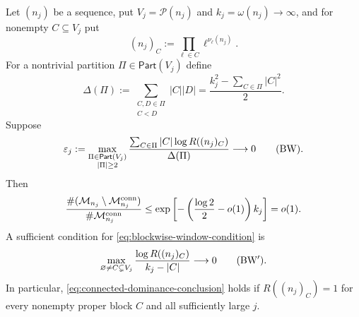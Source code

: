 \begin{theorem}
\label{thm:blockwise-connected-dominance}
Let $(n_j)$ be a sequence, put $V_j=\mathcal P(n_j)$ and
$k_j=\omega(n_j)\to\infty$, and for nonempty $C\subseteq V_j$ put
\[
 (n_j)_C:=\prod_{\ell\in C}\ell^{\nu_\ell(n_j)}.
\]
For a nontrivial partition $\Pi\in\mathsf{Part}(V_j)$ define
\[
 \Delta(\Pi):=\sum_{\substack{C,D\in\Pi\\C<D}}|C||D|
 =\frac{k_j^2-\sum_{C\in\Pi}|C|^2}{2}.
\]
Suppose
\begin{equation}\label{eq:blockwise-window-condition}
 \varepsilon_j:=
 \max_{\substack{\Pi\in\mathsf{Part}(V_j)\\|\Pi|\ge2}}
 \frac{\sum_{C\in\Pi}|C|\log R((n_j)_C)}{\Delta(\Pi)}
 \longrightarrow0\qquad\text{\rm(BW)}.
\end{equation}
Then
\begin{equation}\label{eq:connected-dominance-conclusion}
 \frac{\#(\mathcal M_{n_j}\setminus\mathcal M_{n_j}^{\rm conn})}
 {\#\mathcal M_{n_j}^{\rm conn}}
 \le\exp\left[-\left(\frac{\log2}{2}-o(1)\right)k_j\right]
 =o(1).
\end{equation}
A sufficient condition for \eqref{eq:blockwise-window-condition} is
\begin{equation}\label{eq:blockwise-window-sufficient-condition}
 \max_{\varnothing\ne C\subsetneq V_j}
 \frac{\log R((n_j)_C)}{k_j-|C|}\longrightarrow0
 \qquad\text{\rm(BW$'$)}.
\end{equation}
In particular, \eqref{eq:connected-dominance-conclusion} holds if
$R((n_j)_C)=1$ for every nonempty proper block $C$ and all sufficiently
large $j$.
\end{theorem}

